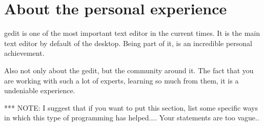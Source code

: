 \newpage
\section{About the personal experience}

gedit is one of the most important text editor in the current times. It is the main text editor by default of the \GNOME desktop. 
Being part of it, is an incredible personal achievement.

Also not only about the gedit, but the community around it. The fact that you are working with such a lot of experts, learning so 
much from them, it is a undeniable experience.




*** NOTE: I suggest that if you want to put this section, list some specific ways in which this 
type of programming has helped.... Your statements are too vague.. 
